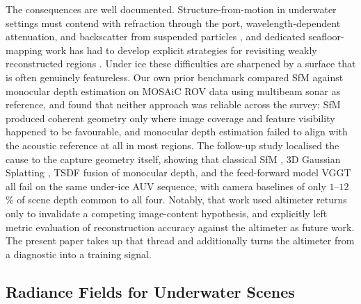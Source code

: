 \documentclass[conference]{IEEEtran}
\begin{document}
The consequences are well documented. Structure-from-motion in underwater
settings must contend with refraction through the port, wavelength-dependent
attenuation, and backscatter from suspended particles
\cite{qiao-2019, bryson-2015}, and dedicated seafloor-mapping work has had to
develop explicit strategies for revisiting weakly reconstructed regions
\cite{she2024seafloor}. Under ice these difficulties are sharpened by a surface
that is often genuinely featureless. Our own prior benchmark
\cite{ours-icra2026-benchmark} compared SfM against monocular depth estimation
on MOSAiC ROV data using multibeam sonar as reference, and found that neither
approach was reliable across the survey: SfM produced coherent geometry only
where image coverage and feature visibility happened to be favourable, and
monocular depth estimation \cite{lin2025depth3recoveringvisual} failed to align
with the acoustic reference at all in most regions. The follow-up study
\cite{ours-eccv2026-breakdown} localised the cause to the capture geometry
itself, showing that classical SfM \cite{schoenberger2016colmap}, 3D Gaussian
Splatting \cite{kerbl20233dgs}, TSDF fusion of monocular depth, and the
feed-forward model VGGT \cite{wang2025vggt} all fail on the same under-ice AUV
sequence, with camera baselines of only $1$--$12$\% of scene depth common to
all four. Notably, that work used altimeter returns only to invalidate a
competing image-content hypothesis, and explicitly left metric evaluation of
reconstruction accuracy against the altimeter as future work. The present
paper takes up that thread and additionally turns the altimeter from a
diagnostic into a training signal.

\subsection{Radiance Fields for Underwater Scenes}
\end{document}
